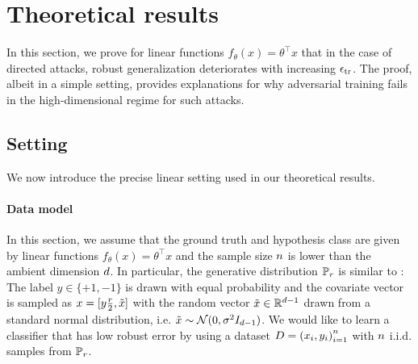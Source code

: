 \section{Theoretical results}
\label{sec:theoryresults}
In this section, we prove for linear functions $f_\theta(x) =
\theta^\top x$ that  in the case of directed attacks, robust
generalization deteriorates with increasing $\epsilon_{\text{tr}}$.
The proof, albeit in a simple setting, provides
explanations for why adversarial training fails in the
high-dimensional regime for such attacks.


\subsection{Setting}
\label{logreg_linear_model}

We now introduce the precise linear setting used in our theoretical results.




\paragraph{Data model}
In this section, we assume that the ground truth and hypothesis class
are given by linear functions $f_\theta(x) = \theta^\top x$ and the
sample size $n$ is lower than the ambient dimension $d$.  In
particular, the generative distribution $\mathbb{P}_r$ is similar to
\cite{tsipras19, kolter19}: The label $y \in \{+1, -1\}$ is drawn with
equal probability and the covariate vector is sampled as $x =
[y\frac{r}{2}, \tilde{x}]$ with the random vector $\tilde{x} \in
\mathbb{R}^{d-1}$ drawn from a standard normal distribution,
i.e. $\tilde{x} \sim \mathcal{N}(0, \sigma^2 I_{d-1})$. We would like to
learn a classifier that has low robust error by using a dataset
$D = {(x_i, y_i)}_{i=1}^n$ with $n$ i.i.d. samples from
$\mathbb{P}_{r}$.

